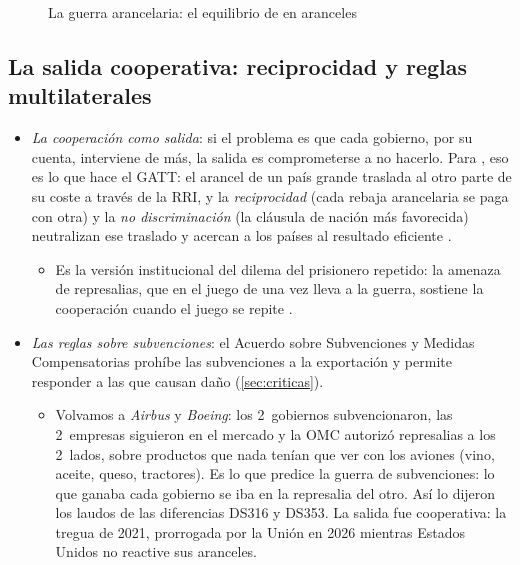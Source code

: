 \documentclass[11pt]{article}
\begin{document}
\begin{figure}[H]
\centering
\caption{La guerra arancelaria: el equilibrio de  en aranceles}\label{fig:johnson}
\end{figure}

\subsection{La salida cooperativa: reciprocidad y reglas multilaterales}\label{sec:cooperacion}

\begin{itemize}
\item \emph{La cooperación como salida}: si el problema es que cada gobierno, por su cuenta, interviene de más, la salida es comprometerse a no hacerlo. Para \textcite{BagwellStaiger1999Economic}, eso es lo que hace el GATT: el arancel de un país grande traslada al otro parte de su coste a través de la RRI, y la \emph{reciprocidad} (cada rebaja arancelaria se paga con otra) y la \emph{no discriminación} (la cláusula de nación más favorecida) neutralizan ese traslado y acercan a los países al resultado eficiente .
  \begin{itemize}
  \item Es la versión institucional del dilema del prisionero repetido: la amenaza de represalias, que en el juego de una vez lleva a la guerra, sostiene la cooperación cuando el juego se repite .
  \end{itemize}
\item \emph{Las reglas sobre subvenciones}: el Acuerdo sobre Subvenciones y Medidas Compensatorias prohíbe las subvenciones a la exportación y permite responder a las que causan daño (\ref{sec:criticas}).
  \begin{itemize}
  \item Volvamos a \emph{Airbus} y \emph{Boeing}: los 2~gobiernos subvencionaron, las 2~empresas siguieron en el mercado y la OMC autorizó represalias a los 2~lados, sobre productos que nada tenían que ver con los aviones (vino, aceite, queso, tractores). Es lo que predice la guerra de subvenciones: lo que ganaba cada gobierno se iba en la represalia del otro. Así lo dijeron los laudos de las diferencias DS316 y DS353\nocite{OMC2019DS316,OMC2020DS353}. La salida fue cooperativa: la tregua de 2021, prorrogada por la Unión en 2026 mientras Estados Unidos no reactive sus aranceles\nocite{USTR2021Aircraft,Gafta2026Aircraft}.

\end{itemize}
\end{itemize}
\end{document}
